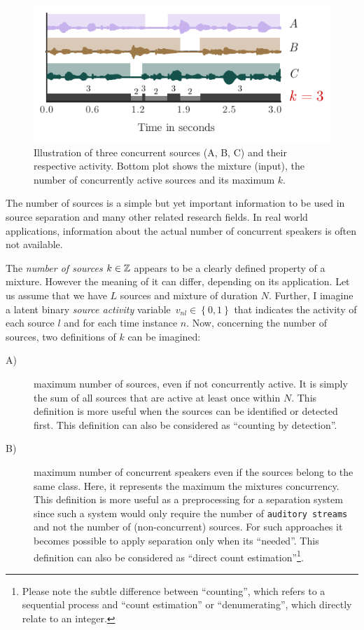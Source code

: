\begin{figure}[h]
  \centering
  \includegraphics[width=0.8\columnwidth]{Chapters/08_Analysis_CountNet/figures/teaser.pdf}
  \caption{Illustration of three concurrent sources (A, B, C) and their respective activity. Bottom plot shows the mixture (input), the number of concurrently active sources and its maximum \(k\).}%
  \label{fig:teaser}%
\end{figure}

The number of sources is a simple but yet important information to be used in source separation and many other related research fields.
In real world applications, information about the actual number of concurrent speakers is often not available.
\par
The \emph{number of sources} \(k \in {\mathbb{Z}}\) appears to be a clearly defined property of a mixture. 
However the meaning of it can differ, depending on its application.
Let us assume that we have \(L\) sources and mixture of duration \(N\).
Further, I imagine a latent binary \textit{source activity} variable~$v_{nl}\in \left\{ 0,1 \right\}$ that indicates the activity of each source \(l\) and for each time instance \(n\).
Now, concerning the number of sources, two definitions of \(k\) can be imagined:

\begin{description}
\item[A)] maximum number of sources, even if not concurrently active. It is simply the sum of all sources that are active at least once within \(N\). This definition is more useful when the sources can be identified or detected first. This definition can also be considered as ``counting by detection''.
\item[B)] maximum number of concurrent speakers even if the sources belong to the same class. Here, it represents the maximum the mixtures concurrency. This definition is more useful as a preprocessing for a separation system since such a system would only require the number of \texttt{auditory\ streams} and not the number of (non-concurrent) sources. For such approaches it becomes possible to apply separation only when its ``needed''. This definition can also be considered as ``direct count estimation''\footnote{Please note the subtle difference between ``counting'', which refers to a sequential process and ``count estimation'' or ``denumerating'', which directly relate to an integer.}.
\end{description}


